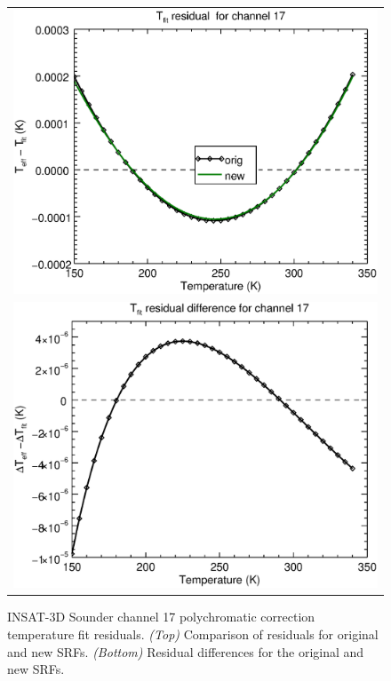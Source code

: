 \begin{figure}[H]
  \centering
  \begin{tabular}{c}
    \includegraphics[scale=0.55]{graphics/sndr/tfit/sndr_insat3d-17.tfit.eps} \\
    \includegraphics[scale=0.55]{graphics/sndr/tfit/sndr_insat3d-17.tfit.difference.eps}
  \end{tabular}
  \caption{INSAT-3D Sounder channel 17 polychromatic correction temperature fit residuals. \emph{(Top)} Comparison of residuals for original and new SRFs. \emph{(Bottom)} Residual differences for the original and new SRFs.}
  \label{fig:sndr_ch17_tfit}
\end{figure}


